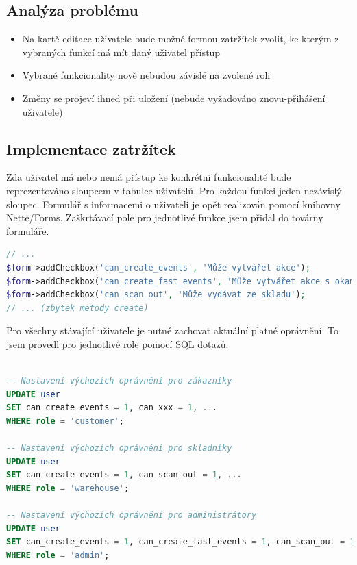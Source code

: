 \subsection{Analýza problému}

\begin{itemize}
    \item Na kartě editace uživatele bude možné formou zatržítek zvolit, ke kterým z vybraných funkcí má mít daný uživatel přístup
    \item Vybrané funkcionality nově nebudou závislé na zvolené roli
    \item Změny se projeví ihned při uložení (nebude vyžadováno znovu-přihášení uživatele)
\end{itemize}

\subsection{Implementace zatržítek}

Zda uživatel má nebo nemá přístup ke konkrétní funkcionalitě bude reprezentováno sloupcem v tabulce uživatelů. Pro každou funkci jeden nezávislý sloupec. Formulář s informacemi o uživateli je opět realizován pomocí knihovny Nette/Forms. Zaškrtávací pole pro jednotlivé funkce jsem přidal do továrny formuláře.

\begin{lstlisting}[language=php, label=src:UserFormFactory.php,caption={Úprava továrny pro formulář uživatelů }]
// ...
$form->addCheckbox('can_create_events', 'Může vytvářet akce');
$form->addCheckbox('can_create_fast_events', 'Může vytvářet akce s okamžitým odběrem');
$form->addCheckbox('can_scan_out', 'Může vydávat ze skladu');
// ... (zbytek metody create)

\end{lstlisting}

Pro všechny stávající uživatele je nutné zachovat aktuální platné oprávnění. To jsem provedl pro jednotlivé role pomocí SQL dotazů. 

\begin{lstlisting}[language=SQL,label=src:UserFormFactory.php,caption={Nastavení výchozích oprávnění pro jednotlivé role uživatelů}]

-- Nastavení výchozích oprávnění pro zákazníky
UPDATE user
SET can_create_events = 1, can_xxx = 1, ...
WHERE role = 'customer';

-- Nastavení výchozích oprávnění pro skladníky
UPDATE user
SET can_create_events = 1, can_scan_out = 1, ...
WHERE role = 'warehouse';

-- Nastavení výchozích oprávnění pro administrátory
UPDATE user
SET can_create_events = 1, can_create_fast_events = 1, can_scan_out = 1, ...
WHERE role = 'admin';

\end{lstlisting}


